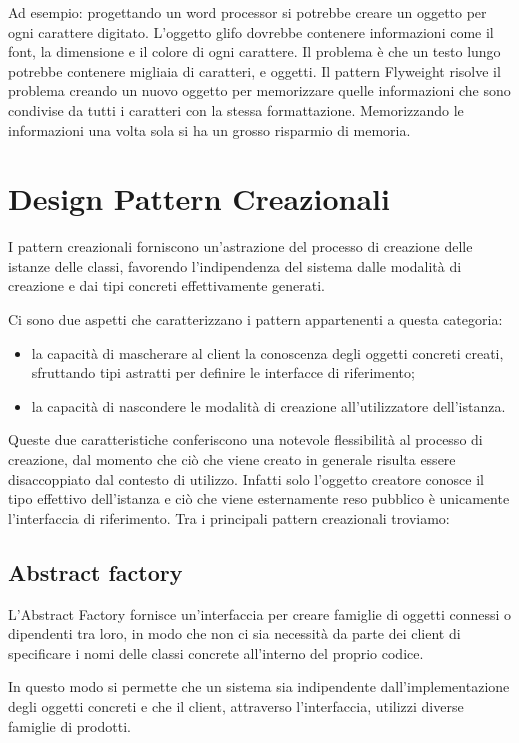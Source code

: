 Ad esempio: progettando un word processor si potrebbe creare un oggetto per ogni carattere digitato. L'oggetto glifo dovrebbe contenere informazioni come il font, la dimensione e il colore di ogni carattere. Il problema è che un testo lungo potrebbe contenere migliaia di caratteri, e oggetti. Il pattern Flyweight risolve il problema creando un nuovo oggetto per memorizzare quelle informazioni che sono condivise da tutti i caratteri con la stessa formattazione. Memorizzando le informazioni una volta sola si ha un grosso risparmio di memoria.
\section{Design Pattern Creazionali}
I pattern creazionali forniscono un’astrazione del processo di creazione delle istanze delle classi, favorendo l’indipendenza del sistema dalle modalità di creazione e dai tipi concreti effettivamente generati.

Ci sono due aspetti che caratterizzano i pattern appartenenti a questa categoria:
\begin{itemize}
	\item la capacità di mascherare al client la conoscenza degli oggetti concreti creati, sfruttando tipi astratti per definire le interfacce di riferimento;
	\item la capacità di nascondere le modalità di creazione all’utilizzatore dell’istanza.
\end{itemize}
Queste due caratteristiche conferiscono una notevole flessibilità al processo di creazione, dal momento che ciò che viene creato in generale risulta essere disaccoppiato dal contesto di utilizzo. Infatti solo l’oggetto creatore conosce il tipo effettivo dell’istanza e ciò che viene esternamente reso pubblico è unicamente l’interfaccia di riferimento.
Tra i principali pattern creazionali troviamo:
\subsection{Abstract factory}
L'Abstract Factory fornisce un'interfaccia per creare famiglie di oggetti connessi o dipendenti tra loro, in modo che non ci sia necessità da parte dei client di specificare i nomi delle classi concrete all'interno del proprio codice.

In questo modo si permette che un sistema sia indipendente dall'implementazione degli oggetti concreti e che il client, attraverso l'interfaccia, utilizzi diverse famiglie di prodotti.

